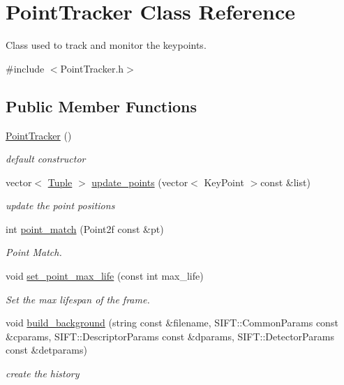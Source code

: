 \hypertarget{class_point_tracker}{
\section{\-Point\-Tracker \-Class \-Reference}
\label{class_point_tracker}
}


\-Class used to track and monitor the keypoints.  




{\ttfamily \#include $<$\-Point\-Tracker.\-h$>$}

\subsection*{\-Public \-Member \-Functions}
\begin{DoxyCompactItemize}
\item 
\hyperlink{class_point_tracker_a9604754cd19cab5f984e4b861c4049d4}{\-Point\-Tracker} ()
\begin{DoxyCompactList}\small\item\em default constructor \end{DoxyCompactList}\item 
vector$<$ \hyperlink{class_tuple}{\-Tuple} $>$ \hyperlink{class_point_tracker_a48270ad5bc84c22c20d84435f85b63be}{update\-\_\-points} (vector$<$ \-Key\-Point $>$const \&list)
\begin{DoxyCompactList}\small\item\em update the point positions \end{DoxyCompactList}\item 
int \hyperlink{class_point_tracker_ac29873729216df07d202485caaab0f20}{point\-\_\-match} (\-Point2f const \&pt)
\begin{DoxyCompactList}\small\item\em \-Point \-Match. \end{DoxyCompactList}\item 
void \hyperlink{class_point_tracker_a6333fab2cae4b6e140cf99e0159dc5cc}{set\-\_\-point\-\_\-max\-\_\-life} (const int max\-\_\-life)
\begin{DoxyCompactList}\small\item\em \-Set the max lifespan of the frame. \end{DoxyCompactList}\item 
void \hyperlink{class_point_tracker_ad596056cb24f8eb2e2157b3c82d812b3}{build\-\_\-background} (string const \&filename, \-S\-I\-F\-T\-::\-Common\-Params const \&cparams, \-S\-I\-F\-T\-::\-Descriptor\-Params const \&dparams, \-S\-I\-F\-T\-::\-Detector\-Params const \&detparams)
\begin{DoxyCompactList}\small\item\em create the history \end{DoxyCompactList}\end{DoxyCompactItemize}

